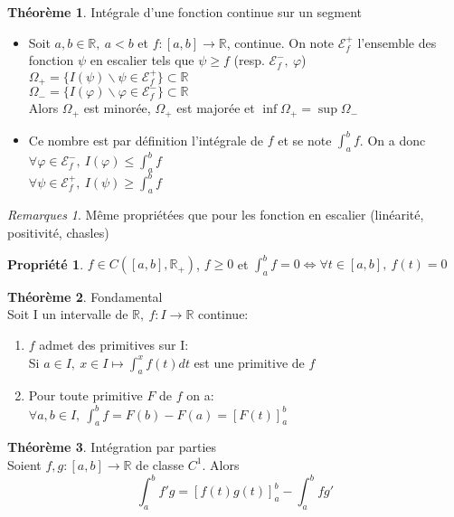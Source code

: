 \documentclass[fleqn]{article}
\theoremstyle{definition} \newtheorem*{defi}{D\'efinition}
\theoremstyle{definition} \newtheorem*{theo}{Th\'eor\`eme}
\theoremstyle{definition} \newtheorem*{coro}{Corollaire}
\theoremstyle{remark} \newtheorem*{rqs}{Remarques}
\theoremstyle{definition} \newtheorem*{prop}{Propri\'et\'e}
\begin{document}
\begin{theo} Int\'egrale d'une fonction continue sur un segment
	\begin{itemize}
		\item Soit $a,b \in \mathbb{R},\ a<b$ et $f:[a,b] \rightarrow \mathbb{R}$, continue. On note $\mathcal{E}_f^+$ l'ensemble des
		fonction $\psi$
			en escalier tels que $\psi \geq f$ (resp. $\mathcal{E}_f^-,\ \varphi$) \\
			$\Omega_+ = \{I(\psi) \backslash \psi \in \mathcal{E}_f^+\} \subset \mathbb{R}$ \\
			$\Omega_- = \{I(\varphi) \backslash \varphi \in \mathcal{E}_f^-\} \subset \mathbb{R}$ \\
			Alors $\Omega_+$ est minor\'ee, $\Omega_+$ est major\'ee et $\inf \Omega_+ = \sup \Omega_-$
		\item Ce nombre est par d\'efinition l'int\'egrale de $f$ et se note $\int_a^b f$. On a donc\\
			$\forall \varphi \in \mathcal{E}_f^-,\ I(\varphi) \leq \int_a^b f$\\
			$\forall \psi \in \mathcal{E}_f^+,\ I(\psi) \geq \int_a^b f$
	\end{itemize}
\end{theo}

\begin{rqs} M\^eme propri\'et\'ees que pour les fonction en escalier (lin\'earit\'e, positivit\'e, chasles)
\end{rqs}

\begin{prop} $f \in C([a,b], \mathbb{R}_+)$, $f \geq 0$ et $\int_a^b f = 0 \Leftrightarrow \forall t \in [a,b],\ f(t) = 0$
\end{prop}

\begin{theo} Fondamental \\
	Soit I un intervalle de $\mathbb{R},\ f:I\rightarrow \mathbb{R}$ continue:
	\begin{enumerate}
		\item $f$ admet des primitives sur I: \\
			Si $a \in I,\ x \in I \mapsto \int_a^x f(t)dt$ est une primitive de $f$
		\item Pour toute primitive $F$ de $f$ on a: \\
			$\forall a,b \in I,\ \int_a^b f = F(b) - F(a) = [F(t)]_a^b$
	\end{enumerate}
\end{theo}

\begin{theo} Int\'egration par parties \\
	Soient $f,g: [a,b] \rightarrow \mathbb{R}$ de classe $C^1$. Alors
	\[\int_a^b f'g = [f(t)g(t)]_a^b - \int_a^b fg'\]
\end{theo}
\end{document}
